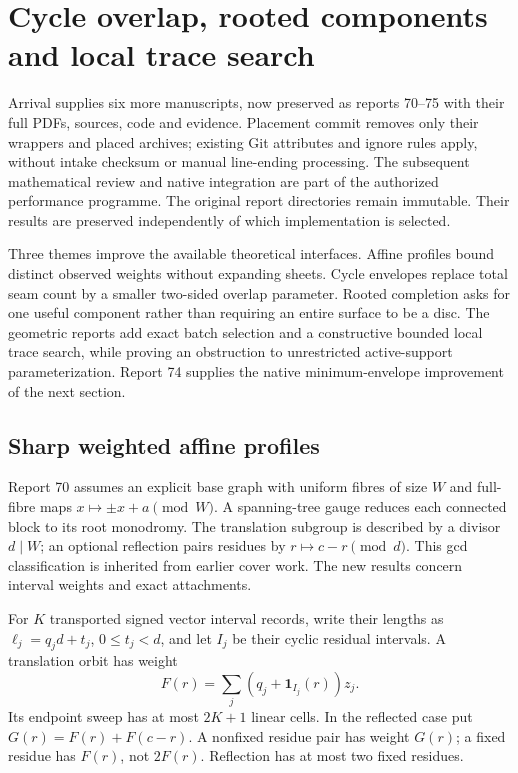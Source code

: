\section{Cycle overlap, rooted components and local trace search}
\label{sec:incoming-contexts}

Arrival  supplies six more manuscripts, now preserved as
reports 70--75 with their full PDFs, sources, code and evidence. Placement
commit  removes only their wrappers and placed archives;
existing Git attributes and ignore rules apply, without intake checksum or
manual line-ending processing. The subsequent mathematical review and
native integration are part of the authorized performance programme. The
original report directories remain immutable. Their results are preserved
independently of which implementation is selected.

Three themes improve the available theoretical interfaces. Affine profiles
bound distinct observed weights without expanding sheets. Cycle envelopes
replace total seam count by a smaller two-sided overlap parameter. Rooted
completion asks for one useful component rather than requiring an entire
surface to be a disc. The geometric reports add exact batch selection and a
constructive bounded local trace search, while proving an obstruction to
unrestricted active-support parameterization. Report 74 supplies the native
minimum-envelope improvement of the next section.

\subsection{Sharp weighted affine profiles}

Report 70 assumes an explicit base graph with uniform fibres of size $W$
and full-fibre maps $x\mapsto\pm x+a\pmod W$. A spanning-tree gauge reduces
each connected block to its root monodromy. The translation subgroup is
described by a divisor $d\mid W$; an optional reflection pairs residues by
$r\mapsto c-r\pmod d$. This gcd classification is inherited from earlier
cover work. The new results concern interval weights and exact attachments.

For $K$ transported signed vector interval records, write their lengths as
$\ell_j=q_jd+t_j$, $0\le t_j<d$, and let $I_j$ be their cyclic residual
intervals. A translation orbit has weight
\[
 F(r)=\sum_j(q_j+\mathbf1_{I_j}(r))z_j.
\]
Its endpoint sweep has at most $2K+1$ linear cells. In the reflected case
put $G(r)=F(r)+F(c-r)$. A nonfixed residue pair has weight $G(r)$; a fixed
residue has $F(r)$, not $2F(r)$. Reflection has at most two fixed residues.

